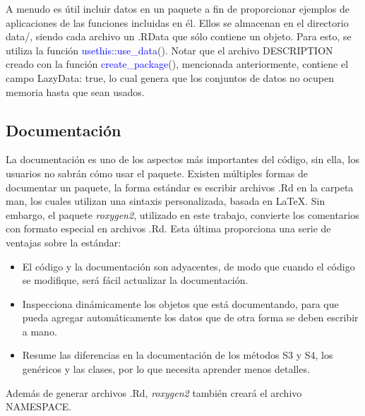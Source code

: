 A menudo es útil incluir datos en un paquete a fin de proporcionar ejemplos de aplicaciones de las funciones incluidas en él. Ellos se almacenan en el directorio data/, siendo cada archivo un .RData que sólo contiene un objeto. Para esto, se utiliza la función \textcolor{blue}{usethis::use\_data}(). Notar que el archivo DESCRIPTION creado con la función \textcolor{blue}{create\_package}(), mencionada anteriormente, contiene el campo LazyData: true, lo cual genera que los conjuntos de datos no ocupen memoria hasta que sean usados.

\subsection{Documentación}

La documentación es uno de los aspectos más importantes del código, sin ella, los usuarios no sabrán cómo usar el paquete. Existen múltiples formas de documentar un paquete, la forma estándar es escribir archivos .Rd en la carpeta man, los cuales utilizan una sintaxis personalizada, basada en LaTeX. Sin embargo, el paquete \emph{roxygen2}, utilizado en este trabajo, convierte los comentarios con formato especial en archivos .Rd. Esta última proporciona una serie de ventajas sobre la estándar:

\begin{itemize}
\item El código y la documentación son adyacentes, de modo que cuando el código se modifique, será fácil actualizar la documentación.

\item Inspecciona dinámicamente los objetos que está documentando, para que pueda agregar automáticamente los datos que de otra forma se deben escribir a mano.

\item Resume las diferencias en la documentación de los métodos S3 y S4, los genéricos y las clases, por lo que necesita aprender menos detalles.
\end{itemize}

Además de generar archivos .Rd, \emph{roxygen2} también creará el archivo NAMESPACE.

